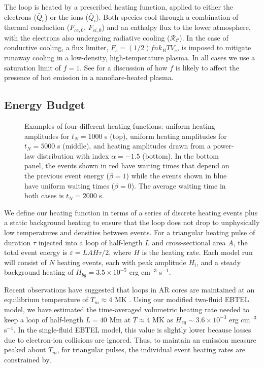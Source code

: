 \documentclass[preprint]{aastex}
\begin{document}
	\par The loop is heated by a prescribed heating function, applied to either the electrons ($\bar{Q}_e$) or the ions ($\bar{Q}_i$). Both species cool through a combination of thermal conduction ($F_{ce,0},\,F_{ci,0}$) and an enthalpy flux to the lower atmosphere, with the electrons also undergoing radiative cooling ($\mathcal{R_C}$). In the case of conductive cooling, a flux limiter, $F_s=(1/2)fnk_BTV_e$, is imposed to mitigate runaway cooling in a low-density, high-temperature plasma. In all cases we use a saturation limit of $f=1$. See  for a discussion of how $f$ is likely to affect the presence of hot emission in a nanoflare-heated plasma.
	\subsection{Energy Budget}
	\label{subsec:params}
	\begin{figure}
		\caption{Examples of four different heating functions: uniform heating amplitudes for $t_N=1000$ s (top), uniform heating amplitudes for $t_N=5000$ s (middle), and heating amplitudes drawn from a power-law distribution with index $\alpha=-1.5$ (bottom). In the bottom panel, the events shown in red have waiting times that depend on the previous event energy ($\beta=1$) while the events shown in blue have uniform waiting times ($\beta=0$). The average waiting time in both cases is $t_N=2000$ s.}
		\label{fig:heating_funcs}
	\end{figure}
	\par We define our heating function in terms of a series of discrete heating events plus a static background heating to ensure that the loop does not drop to unphysically low temperatures and densities between events. For a triangular heating pulse of duration $\tau$ injected into a loop of half-length $L$ and cross-sectional area $A$, the total  event energy is $\varepsilon=LAH\tau/2$, where $H$ is the heating rate. Each model run will consist of $N$ heating events, each with peak amplitude $H_i$, and a steady background heating of $H_{bg}=3.5\times10^{-5}$ erg cm$^{-3}$ s$^{-1}$.
	\par Recent observations have suggested that loops in AR cores are maintained at an equilibrium temperature of $T_{m}\approx4$ MK \citep{warren_constraints_2011,warren_systematic_2012}. Using our modified two-fluid EBTEL model, we have estimated the time-averaged volumetric heating rate needed to keep a loop of half-length $L=40$ Mm at $\bar{T}\approx4$ MK as  $H_{eq}\sim3.6\times10^{-3}$ erg cm$^{-3}$ s$^{-1}$. In the single-fluid EBTEL model, this value is slightly lower because losses due to electron-ion collisions are ignored. Thus, to maintain an emission measure peaked about $T_{m}$, for triangular pulses, the individual event heating rates are constrained by,
\end{document}
